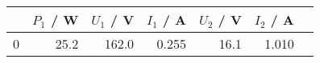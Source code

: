 \begin{tabular}{lrrrrrr}
	\toprule
	{} & $P_1$ / \si{\watt} & $U_1$ / \si{\volt} & $I_1$ / \si{\ampere} & $U_2$ / \si{\volt} & $I_2$ / \si{\ampere} \\
	\midrule
	0  & 25.2               & 162.0              & 0.255                & 16.1               & 1.010                \\
	\bottomrule
\end{tabular}
